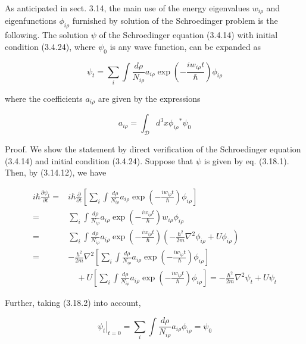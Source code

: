 \documentclass{article}
\begin{document}
As anticipated in sect. 3.14, the main use of the energy eigenvalues $w_{i \rho}$ and eigenfunctions $\phi_{i \rho}$ furnished by solution of the Schroedinger problem is the following. The solution $\psi$ of the Schroedinger equation (3.4.14) with initial condition (3.4.24), where $\psi_{0}$ is any wave function, can be expanded as
 
\begin{equation*}
\psi_{t}=\sum_{i} \int \frac{d \rho}{N_{i \rho}} a_{i \rho} \exp \left(-\frac{i w_{i \rho} t}{\hbar}\right) \phi_{i \rho} \tag{3.18.1}
\end{equation*}
 
where the coefficients $a_{i \rho}$ are given by the expressions
 
\begin{equation*}
a_{i \rho}=\int_{\mathcal{D}} d^{3} x \phi_{i \rho}{ }^{*} \psi_{0} \tag{3.18.2}
\end{equation*}
 

Proof. We show the statement by direct verification of the Schroedinger equation (3.4.14) and initial condition (3.4.24). Suppose that $\psi$ is given by eq. (3.18.1). Then, by (3.14.12), we have
 
\begin{align*}
i \hbar \frac{\partial \psi_{t}}{\partial t}= & i \hbar \frac{\partial}{\partial t}\left[\sum_{i} \int \frac{d \rho}{N_{i \rho}} a_{i \rho} \exp \left(-\frac{i w_{i \rho} t}{\hbar}\right) \phi_{i \rho}\right]  \tag{3.18.3}\\
= & \sum_{i} \int \frac{d \rho}{N_{i \rho}} a_{i \rho} \exp \left(-\frac{i w_{i \rho} t}{\hbar}\right) w_{i \rho} \phi_{i \rho} \\
= & \sum_{i} \int \frac{d \rho}{N_{i \rho}} a_{i \rho} \exp \left(-\frac{i w_{i \rho} t}{\hbar}\right)\left(-\frac{\hbar^{2}}{2 m} \nabla^{2} \phi_{i \rho}+U \phi_{i \rho}\right) \\
= & -\frac{\hbar^{2}}{2 m} \nabla^{2}\left[\sum_{i} \int \frac{d \rho}{N_{i \rho}} a_{i \rho} \exp \left(-\frac{i w_{i \rho} t}{\hbar}\right) \phi_{i \rho}\right] \\
& \quad+U\left[\sum_{i} \int \frac{d \rho}{N_{i \rho}} a_{i \rho} \exp \left(-\frac{i w_{i \rho} t}{\hbar}\right) \phi_{i \rho}\right]=-\frac{\hbar^{2}}{2 m} \nabla^{2} \psi_{t}+U \psi_{t}
\end{align*}
 

Further, taking (3.18.2) into account,
 
\begin{equation*}
\left.\psi_{t}\right|_{t=0}=\sum_{i} \int \frac{d \rho}{N_{i \rho}} a_{i \rho} \phi_{i \rho}=\psi_{0} \tag{3.18.4}
\end{equation*}
 
\end{document}
